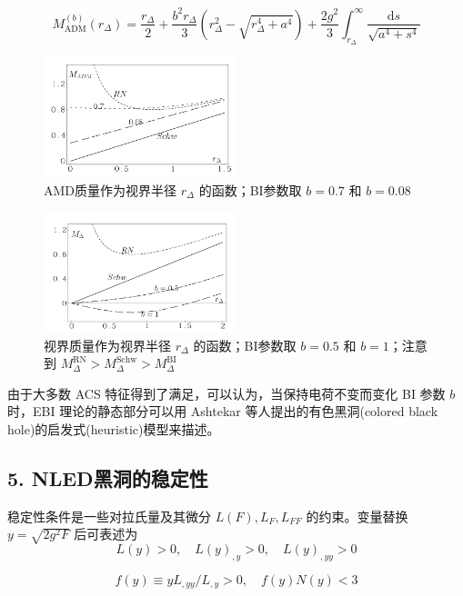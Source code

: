 \documentclass[aps,prl,preprint,groupedaddress,showkeys]{revtex4-2}
\begin{document}
$$
M_{\mathrm{ADM}}^{(b)}(r_\Delta)
=\frac{r_\Delta }{2 } + \frac{b^2 r_\Delta }{3 } \left(r_\Delta^2 - \sqrt{r_\Delta^4 + a^4} \right) + \frac{2g^2 }{3 } \int_{r_\Delta}^{\infty} \frac{\mathrm{d}s }{\sqrt{a^4+s^4} }
$$

\begin{figure}[htbp]
    \centering
    \includegraphics[width=0.5\textwidth]{fig/fig9.png}
    \caption{AMD质量作为视界半径 $r_\Delta$ 的函数；BI参数取 $b=0.7$ 和 $b=0.08$}
\end{figure}

\begin{figure}[htbp]
    \centering
    \includegraphics[width=0.5\textwidth]{fig/fig10.png}
    \caption{视界质量作为视界半径 $r_\Delta$ 的函数；BI参数取 $b=0.5$ 和 $b=1$；注意到 $M_{\Delta}^{\mathrm{RN}}>M_{\Delta}^{\mathrm{Schw}}>M_{\Delta}^{\mathrm{BI}}$}
\end{figure}

由于大多数 ACS 特征得到了满足，可以认为，当保持电荷不变而变化 BI 参数 $b$ 时，EBI 理论的静态部分可以用 Ashtekar 等人提出的有色黑洞(colored black hole)的启发式(heuristic)模型来描述。

\subsection{5. NLED黑洞的稳定性}

稳定性条件是一些对拉氏量及其微分 $L(F),L_F,L_{FF}$ 的约束\cite{moreno2003stability}。变量替换 $y=\sqrt{2g^2 F}$ 后可表述为
$$
L(y)>0,\quad
L(y)_{,y}>0,\quad
L(y)_{,yy}>0 
$$

$$
f(y)
\equiv yL_{,yy} / L_{,y} > 0,\quad
f(y) N(y) < 3    
$$
\end{document}
